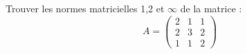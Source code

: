\begin{exercice}\label{exoGeomAnal-0043}

Trouver les normes matricielles 1,2 et $\infty$ de la matrice :
$$
A=\begin{pmatrix}
2&1&1\\
2&3&2\\
1&1&2
\end{pmatrix}
$$


\end{exercice}
